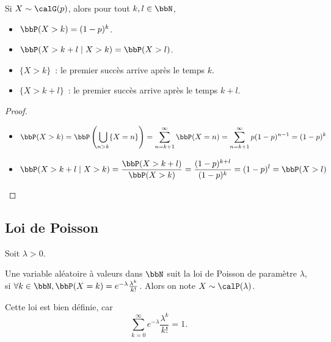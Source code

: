 \begin{prop}
    Si $X \sim \calG(p)$, alors pour tout $k, l \in \bbN$,
    \begin{itemize}
        \item $\bbP(X > k) = (1 - p)^k$.
        \item $\bbP(X > k + l \mid X > k) = \bbP(X > l)$.
    \end{itemize}
\end{prop}

\begin{rqq}[Interprétation]
    \begin{itemize}
        \item $\{ X > k \}$~: le premier succès arrive après le temps $k$.
        \item $\{ X > k + l \}$~: le premier succès arrive après le temps $k + l$.
    \end{itemize}
\end{rqq}

\begin{proof}
    $\ $
    \begin{itemize}
        \item \[ \bbP(X > k) = \bbP \left( \bigcup_{n > k} \{ X = n \} \right)
                  = \sum_{n = k + 1}^\infty \bbP(X = n) = \sum_{n = k + 1}^\infty p(1 - p)^{n - 1} = (1 - p)^k \]
        \item \[ \bbP(X > k + l \mid X > k) = \frac{\bbP(X > k + l)}{\bbP(X > k)}
                  = \frac{(1 - p)^{k + l}}{(1 - p)^k} = (1 - p)^l = \bbP(X > l) \qedhere \]
    \end{itemize}
\end{proof}

\subsection{Loi de Poisson}

Soit $\lambda > 0$.

\begin{deff}
    Une variable aléatoire à valeurs dans $\bbN$ suit la loi de Poisson de paramètre $\lambda$,
    si $\forall k \in \bbN, \bbP(X = k) = e^{-\lambda} \frac{\lambda^k}{k!}$.
    Alors on note $X \sim \calP(\lambda)$.
\end{deff}

\begin{rqq}
    Cette loi est bien définie, car
    \[ \sum_{k = 0}^\infty e^{-\lambda} \frac{\lambda^k}{k!} = 1. \]
\end{rqq}

